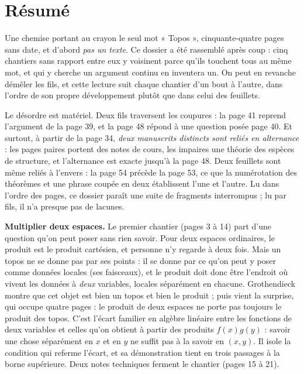 \documentclass[11pt,a4paper]{article}
\begin{document}
\section*{Résumé}

\begin{resume}
Une chemise portant au crayon le seul mot « Topos », cinquante-quatre pages
sans date, et d'abord \emph{pas un texte}. Ce
dossier a été rassemblé après coup : cinq chantiers sans rapport entre eux y
voisinent parce qu'ils touchent tous au même mot, et qui y cherche un argument
continu en inventera un. On peut en revanche démêler les fils, et cette
lecture suit chaque chantier d'un bout à l'autre, dans l'ordre de son propre
développement plutôt que dans celui des feuillets.

Le désordre est matériel. Deux fils traversent les coupures :
la page 41 reprend l'argument de la page 39, et la page 48 répond à une
question posée page 40. Et surtout, à partir de la page 34, \emph{deux
manuscrits distincts sont reliés en alternance} : les pages paires portent des
notes de cours, les impaires une théorie des espèces de structure, et
l'alternance est exacte jusqu'à la page 48. Deux feuillets sont même reliés à l'envers :
la page 54 précède la page 53, ce que la numérotation des théorèmes et une
phrase coupée en deux établissent l'une et l'autre. Lu dans l'ordre des pages,
ce dossier paraît une suite de fragments interrompus ; lu par fils, il n'a
presque pas de lacunes.


\textbf{Multiplier deux espaces.} Le premier chantier (pages 3 à 14) part
d'une question qu'on peut poser sans rien savoir. Pour deux espaces
ordinaires, le produit est le produit cartésien, et personne n'y regarde à deux
fois. Mais un topos ne se donne pas par ses points : il se donne par ce qu'on
peut y poser comme données locales (ses faisceaux), et le produit doit donc
être l'endroit où vivent les données à \emph{deux} variables, locales
séparément en chacune. Grothendieck montre que cet objet est bien un topos et
bien le produit ; puis vient la surprise, qui occupe quatre pages : le produit
de deux espaces ne porte pas toujours le produit des topos. C'est l'écart
familier en algèbre linéaire entre les fonctions de deux variables et celles
qu'on obtient à partir des produits $f(x)g(y)$ : savoir une chose séparément en
$x$ et en $y$ ne suffit pas à la savoir en $(x,y)$. Il isole la condition
qui referme l'écart, et sa démonstration tient en trois passages à la borne
supérieure. Deux notes techniques ferment le chantier (pages 15 à 21).


\end{resume}
\end{document}
